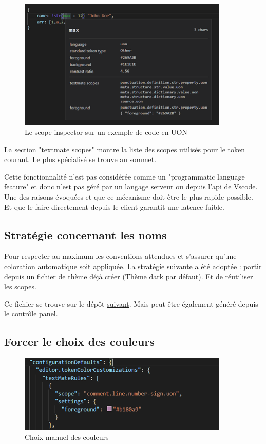 \documentclass[
    iict, %
    il, %
]{heig-tb}
\begin{document}
\begin{figure}[!ht]
    \begin{center}
        \includegraphics[width=10cm]{assets/figures/scope-inspector.png}
    \end{center}
    \caption[Scope inspector]{\label{basic-uon} Le scope inspector sur un exemple de code en UON}
\end{figure}

La section "textmate scopes" montre la liste des scopes utilisés pour le token courant. Le plus spécialisé se trouve au sommet.

Cette fonctionnalité n'est pas considérée comme un "programmatic language feature" et donc n'est pas géré par un langage serveur ou depuis l'api de Vscode. Une des raisons évoquées et que ce mécanisme doit être le plus rapide possible. Et que le faire directement depuis le client garantit une latence faible.

\subsection{Stratégie concernant les noms}
Pour respecter au maximum les conventions attendues et s'assurer qu'une coloration automatique soit appliquée. La stratégie suivante a été adoptée : partir depuis un fichier de thème déjà créer (Thème dark par défaut). Et de réutiliser les scopes.

Ce fichier se trouve sur le dépôt \href{https://github.com/microsoft/vscode/blob/main/extensions/theme-defaults/themes/dark_vs.json}{suivant}.
Mais peut être également généré depuis le contrôle panel.

\subsection{Forcer le choix des couleurs}
\begin{figure}[!ht]
    \begin{center}
        \includegraphics[width=10cm]{assets/figures/manual-settings-color.png}
    \end{center}
    \caption[Choix manuel des couleurs]{\label{manual-settings-color} Choix manuel des couleurs}
\end{figure}
\end{document}

